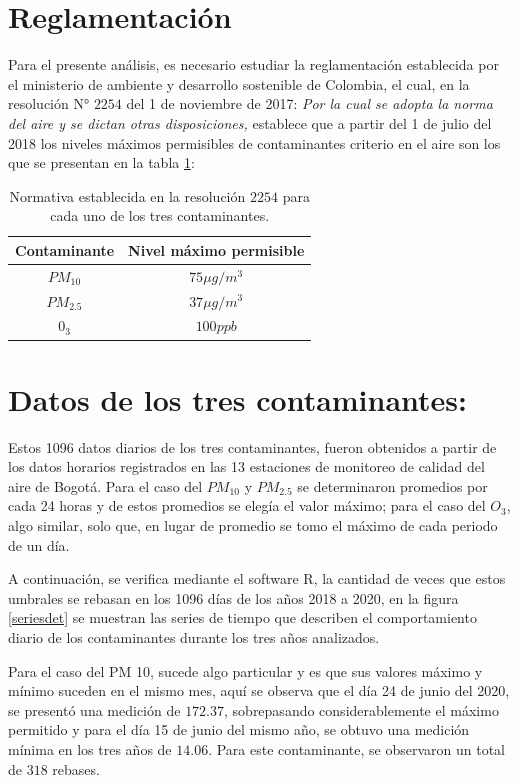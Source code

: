 \section{Reglamentación}
Para el presente análisis, es necesario estudiar la reglamentación establecida por el ministerio de ambiente y desarrollo sostenible de Colombia, el cual, en la resolución N° $2254$ del 1 de noviembre de 2017: \textit{Por la cual se adopta la norma del aire y se dictan otras disposiciones,} establece que a partir del 1 de julio del 2018 los niveles máximos permisibles de contaminantes criterio en el aire son los que se presentan en la tabla \ref{nivelesperm}:
\begin{table}[!h]
\begin{center}
\begin{tabular}{|c|c|}
\hline
Contaminante & Nivel máximo permisible \\
\hline \hline
$PM_{10}$ &$ 75\mu g /m^3$ \\ \hline
$PM_{2.5}$ & $ 37 \mu g /m^3$  \\ \hline
$0_3$ & $100 ppb$ \\\hline
\end{tabular}
\caption{Normativa establecida en la resolución $2254$ para cada uno de los tres contaminantes.}
\label{nivelesperm}
\end{center}
\end{table}

\section{Datos de los tres contaminantes:}

Estos 1096 datos diarios de los tres contaminantes, fueron obtenidos a partir de los datos horarios registrados en las 13 estaciones de monitoreo de calidad del aire de Bogotá. Para el caso del $PM_{10}$ y $PM_{2.5}$ se determinaron promedios por cada 24 horas y de estos promedios se elegía el valor máximo; para el caso del $O_3$, algo similar, solo que, en lugar de promedio se tomo el máximo de cada periodo de un día. 

A continuación, se verifica mediante el software R, la cantidad de veces que estos umbrales se rebasan en los 1096 días de los años 2018 a 2020, en la figura \ref{seriesdet} se muestran las series de tiempo que describen el comportamiento diario de los contaminantes durante los tres años analizados.

Para el caso del PM 10, sucede algo particular y es que sus valores máximo y mínimo suceden en el mismo mes, aquí se observa que el día 24 de junio del 2020, se presentó una medición de $172.37$, sobrepasando considerablemente el máximo permitido y para el día 15 de junio del mismo año, se obtuvo una medición mínima en los tres años de $14.06$. Para este contaminante, se observaron un total de $318$ rebases.

